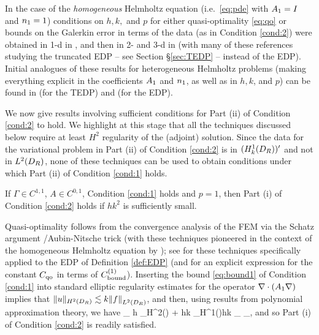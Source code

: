 In the case of the \emph{homogeneous} Helmholtz equation (i.e.~\eqref{eq:pde} with $A_{1}= I$ and $n_{1}=1$) conditions on $h,k,$ and $p$ for either quasi-optimality \eqref{eq:qo} or bounds on the Galerkin error in terms of the data (as in Condition \ref{cond:2}) were obtained in 1-d in \cite{IhBa:95, IhBa:97}, and then in 2- and 3-d in \cite{Me:95, Sa:06, MeSa:10, MeSa:11, Wu:13, ZhWu:13, ChNi:18} (with many of these references studying the truncated EDP -- see Section \S\ref{sec:TEDP} -- instead of the EDP). 
Initial analogues of these results for heterogeneous Helmholtz problems (making everything explicit in the coefficients $A_{1}$ and $n_{1}$, as well as in $h, k$, and $p$) can be found in \cite{GrSa:18} (for the TEDP) and \cite{GaSpWu:18} (for the EDP).
 
We now give results involving sufficient conditions for Part (ii) of Condition \ref{cond:2}  to hold. 
We highlight at this stage that all the techniques discussed below
require at least $H^2$ regularity of the (adjoint) solution. Since the data for the variational problem in Part (ii) of Condition \ref{cond:2} is in $(\HokDR)'$ and not in $\LtDR$, none of these techniques can be used to obtain conditions under which Part (ii) of Condition \ref{cond:1} holds.

\ble[Conditions under which Part (i) of Condition \ref{cond:2} holds when $p=1$]\label{lem:hp1}
If $\Gamma\in C^{1,1}$, $A\in C^{0,1}$, Condition \ref{cond:1} holds and $p=1$, then Part (i) of Condition \ref{cond:2} holds
if $h k^2$ is sufficiently small. 
\ele

Quasi-optimality follows from the convergence analysis of the FEM via the Schatz argument \cite{Sc:74}/Aubin-Nitsche trick (with these techniques pioneered in the context of the homogeneous Helmholtz equation by \cite{Me:95, Sa:06, MeSa:10, MeSa:11}); see \cite[\S6]{GaSpWu:18} for these techniques specifically applied to the EDP of Definition \ref{def:EDP} (and for an explicit expression for the constant $C_{\rm qo}$ in terms of $C_{\rm bound}^{(1)}$). 
Inserting the bound  \eqref{eq:bound1} of Condition \ref{cond:1} into standard elliptic regularity estimates for the operator $\nabla\cdot(A_{1}\nabla )$ implies that $\|u\|_{H^2(\DR)}\lesssim k\N{f}_{\LtDR}$, and then, using results from polynomial approximation theory, we have
 \beq\label{eq:AN1}
_{\HokDR} \lesssim h _{H^2(\DR)} + hk _{H^1(\DR)}\lesssim hk _{\LtDR} \lesssim {}_{\LtDR},
\eeq
and so Part (i) of Condition \ref{cond:2} is readily satisfied.
\epf

